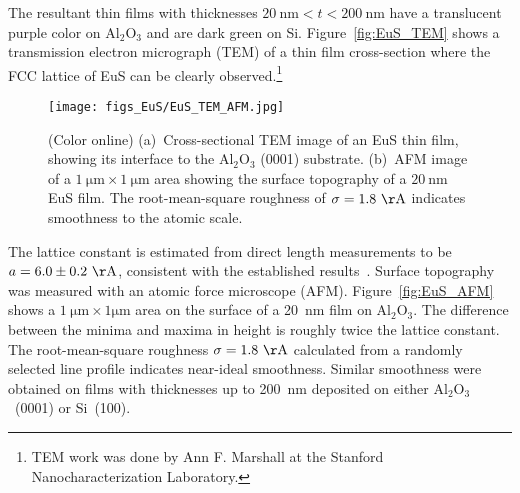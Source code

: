 The resultant thin films with thicknesses $20~\mathrm{nm}<t<200~\mathrm{nm}$ have a translucent purple color on Al$_2$O$_3$ and are dark green on Si. Figure~\ref{fig:EuS_TEM} shows a transmission electron micrograph (TEM) of a thin film cross-section where the FCC lattice of EuS can be clearly observed.\footnote{TEM work was done by Ann F. Marshall at the Stanford Nanocharacterization Laboratory.} %
%
\begin{figure}[ht]%
    \subfloat{\label{fig:EuS_TEM}}%
    \subfloat{\label{fig:EuS_AFM}}%
    \centering%
    \texttt{[image: figs\_EuS/EuS\_TEM\_AFM.jpg]}%
    \caption[Micrographs of the cross-section and of the surface of an EuS thin film]{\label{fig:EuS_TEM_AFM}(Color online) (a)~Cross-sectional TEM image of an EuS thin film, showing its interface to the Al$_2$O$_3$ (0001) substrate. (b)~AFM image of a $1~\mathrm{\mu{}m}\times{}1~\mathrm{\mu{}m}$ area showing the surface topography of a $20~\mathrm{nm}$ EuS film. The root-mean-square roughness of $\sigma=1.8~\mathrm\AA$ indicates smoothness to the atomic scale.}%
\end{figure}%
%
The lattice constant is estimated from direct length measurements to be $a=6.0\pm0.2~\mathrm\AA$, consistent with the established results~\cite{EuS_Shafer}. Surface topography was measured with an atomic force microscope (AFM). Figure~\ref{fig:EuS_AFM} shows a $1~\mathrm{\mu{}m}\times{}1\mathrm{\mu{}m}$ area on the surface of a 20~nm film on Al$_2$O$_3$. The difference between the minima and maxima in height is roughly twice the lattice constant. The root-mean-square roughness $\sigma=1.8~\mathrm\AA$ calculated from a randomly selected line profile indicates near-ideal smoothness. Similar smoothness were obtained on films with thicknesses up to 200~nm deposited on either Al$_2$O$_3$~(0001) or Si~(100).

